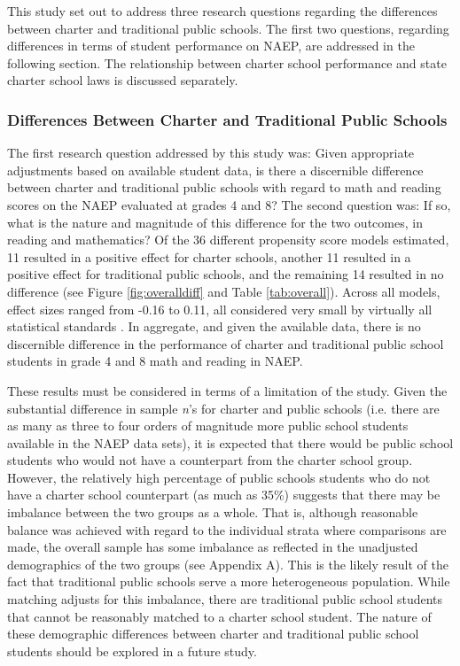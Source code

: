\documentclass[letterpaper,12pt]{article} %
\begin{document}
This study set out to address three research questions regarding the differences between charter and traditional public schools. The first two questions, regarding differences in terms of student performance on NAEP, are addressed in the following section. The relationship between charter school performance and state charter school laws is discussed separately.

\subsubsection{Differences Between Charter and Traditional Public Schools}

The first research question addressed by this study was: Given appropriate adjustments based on available student data, is there a discernible difference between charter and traditional public schools with regard to math and reading scores on the NAEP evaluated at grades 4 and 8? The second question was: If so, what is the nature and magnitude of this difference for the two outcomes, in reading and mathematics? Of the 36 different propensity score models estimated, 11 resulted in a positive effect for charter schools, another 11 resulted in a positive effect for traditional public schools, and the remaining 14 resulted in no difference (see Figure \ref{fig:overalldiff} and Table \ref{tab:overall}). Across all models, effect sizes ranged from -0.16 to 0.11, all considered very small by virtually all statistical standards \cite{Cohen1988}. In aggregate, and given the available data, there is no discernible difference in the performance of charter and traditional public school students in grade 4 and 8 math and reading in NAEP.

These results must be considered in terms of a limitation of the study. Given the substantial difference in sample \textit{n}'s for charter and public schools (i.e. there are as many as three to four orders of magnitude more public school students available in the NAEP data sets), it is expected that there would be public school students who would not have a counterpart from the charter school group. However, the relatively high percentage of public schools students who do not have a charter school counterpart (as much as 35\%) suggests that there may be imbalance between the two groups as a whole. That is, although reasonable balance was achieved with regard to the individual strata where comparisons are made, the overall sample has some imbalance as reflected in the unadjusted demographics of the two groups (see Appendix A). This is the likely result of the fact that traditional public schools serve a more heterogeneous population. While matching adjusts for this imbalance, there are traditional public school students that cannot be reasonably matched to a charter school student. The nature of these demographic differences between charter and traditional public school students should be explored in a future study.
\end{document}
